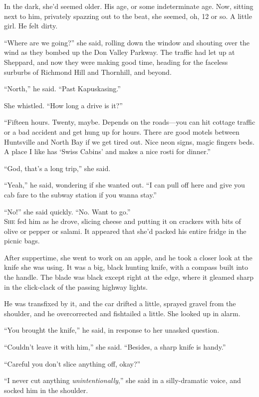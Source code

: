 In the dark, she'd seemed older.  His age, or some indeterminate age. 
Now, sitting next to him, privately spazzing out to the beat, she
seemed, oh, 12 or so.  A little girl.  He felt dirty.

``Where are we going?'' she said, rolling down the window and shouting
over the wind as they bombed up the Don Valley Parkway.  The traffic
had let up at Sheppard, and now they were making good time, heading
for the faceless surburbs of Richmond Hill and Thornhill, and beyond.

``North,'' he said.  ``Past Kapuskasing.''

She whistled.  ``How long a drive is it?''

``Fifteen hours.  Twenty, maybe.  Depends on the roads---you can hit
cottage traffic or a bad accident and get hung up for hours.  There
are good motels between Huntsville and North Bay if we get tired out. 
Nice neon signs, magic fingers beds.  A place I like has `Swiss
Cabins' and makes a nice rosti for dinner.''

``God, that's a long trip,'' she said.

``Yeah,'' he said, wondering if she wanted out.  ``I can pull off here
and give you cab fare to the subway station if you wanna stay.''

``No!'' she said quickly.  ``No.  Want to go.''
\\
\lettrine[lines=3, lhang=.5, nindent=0pt, findent=2pt]{S}{he} fed him as he drove, slicing cheese and putting it on crackers
with bits of olive or pepper or salami.  It appeared that she'd packed
his entire fridge in the picnic bags.

After suppertime, she went to work on an apple, and he took a closer
look at the knife she was using.  It was a big, black hunting knife,
with a compass built into the handle.  The blade was black except
right at the edge, where it gleamed sharp in the click-clack of the
passing highway lights.

He was transfixed by it, and the car drifted a little, sprayed gravel
from the shoulder, and he overcorrected and fishtailed a little.  She
looked up in alarm.

``You brought the knife,'' he said, in response to her unasked
question.

``Couldn't leave it with him,'' she said.  ``Besides, a sharp knife is
handy.''

``Careful you don't slice anything off, okay?''

``I never cut anything \textit{unintentionally},'' she said in a
silly-dramatic voice, and socked him in the shoulder.

